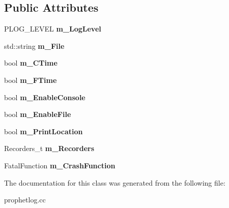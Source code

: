 \subsection*{Public Attributes}
\begin{DoxyCompactItemize}
\item 
\hypertarget{classPlog_1_1Setting_ae780b0802f45be241975826529b4afdc}{
PLOG\_\-LEVEL {\bfseries m\_\-LogLevel}}
\label{classPlog_1_1Setting_ae780b0802f45be241975826529b4afdc}

\item 
\hypertarget{classPlog_1_1Setting_a7ce9f256edbcc73d59b99b7248f3cefa}{
std::string {\bfseries m\_\-File}}
\label{classPlog_1_1Setting_a7ce9f256edbcc73d59b99b7248f3cefa}

\item 
\hypertarget{classPlog_1_1Setting_a2be8c36482b885337070614d6f3f2272}{
bool {\bfseries m\_\-CTime}}
\label{classPlog_1_1Setting_a2be8c36482b885337070614d6f3f2272}

\item 
\hypertarget{classPlog_1_1Setting_addb68862383e97438f322864becc844b}{
bool {\bfseries m\_\-FTime}}
\label{classPlog_1_1Setting_addb68862383e97438f322864becc844b}

\item 
\hypertarget{classPlog_1_1Setting_a50159970f3f4656360ae4fef4ef051ed}{
bool {\bfseries m\_\-EnableConsole}}
\label{classPlog_1_1Setting_a50159970f3f4656360ae4fef4ef051ed}

\item 
\hypertarget{classPlog_1_1Setting_a6b96ec6940210cfd99e90954b376c613}{
bool {\bfseries m\_\-EnableFile}}
\label{classPlog_1_1Setting_a6b96ec6940210cfd99e90954b376c613}

\item 
\hypertarget{classPlog_1_1Setting_ace3bd8c0c1003c63ed9f249d083878bb}{
bool {\bfseries m\_\-PrintLocation}}
\label{classPlog_1_1Setting_ace3bd8c0c1003c63ed9f249d083878bb}

\item 
\hypertarget{classPlog_1_1Setting_aaf06938c4085bb853a6834ef862b5c54}{
Recorders\_\-t {\bfseries m\_\-Recorders}}
\label{classPlog_1_1Setting_aaf06938c4085bb853a6834ef862b5c54}

\item 
\hypertarget{classPlog_1_1Setting_a7976384ea552f28fb0f00f8bcba6816d}{
FatalFunction {\bfseries m\_\-CrashFunction}}
\label{classPlog_1_1Setting_a7976384ea552f28fb0f00f8bcba6816d}

\end{DoxyCompactItemize}


The documentation for this class was generated from the following file:\begin{DoxyCompactItemize}
\item 
prophetlog.cc\end{DoxyCompactItemize}
